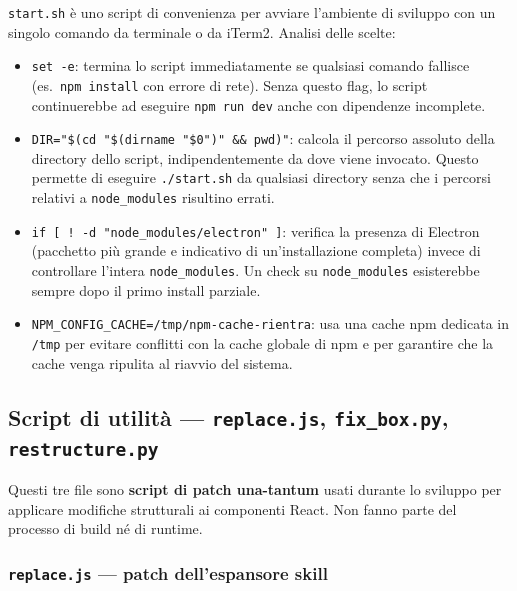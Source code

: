 \documentclass[a4paper,12pt]{article}
\begin{document}
\noindent \texttt{start.sh} \`{e} uno script di convenienza per avviare
l'ambiente di sviluppo con un singolo comando da terminale o da
iTerm2. Analisi delle scelte:

\begin{itemize}
  \item \texttt{set -e}: termina lo script immediatamente se qualsiasi
        comando fallisce (es.\ \texttt{npm install} con errore di rete).
        Senza questo flag, lo script continuerebbe ad eseguire
        \texttt{npm run dev} anche con dipendenze incomplete.
  \item \texttt{DIR="\$(cd "\$(dirname "\$0")" \&\& pwd)"}: calcola
        il percorso assoluto della directory dello script, indipendentemente
        da dove viene invocato. Questo permette di eseguire
        \texttt{./start.sh} da qualsiasi directory senza che i percorsi
        relativi a \texttt{node\_modules} risultino errati.
  \item \texttt{if [ ! -d "node\_\allowbreak{}modules/electron" ]}: verifica la
        presenza di Electron (pacchetto pi\`{u} grande e indicativo
        di un'installazione completa) invece di controllare
        l'intera \texttt{node\_modules}. Un check su
        \texttt{node\_modules} esisterebbe sempre dopo il primo
        install parziale.
  \item \texttt{NPM\_\allowbreak{}CONFIG\_\allowbreak{}CACHE=/tmp/npm-cache-rientra}: usa una
        cache npm dedicata in \texttt{/tmp} per evitare conflitti con
        la cache globale di npm e per garantire che la cache venga
        ripulita al riavvio del sistema.
\end{itemize}

\subsection{Script di utilit\`{a} --- \texttt{replace.js}, \texttt{fix\_box.py}, \texttt{restructure.py}}

Questi tre file sono \textbf{script di patch una-tantum} usati durante
lo sviluppo per applicare modifiche strutturali ai componenti React.
Non fanno parte del processo di build n\'{e} di runtime.

\subsubsection{\texttt{replace.js} --- patch dell'espansore skill}
\end{document}
